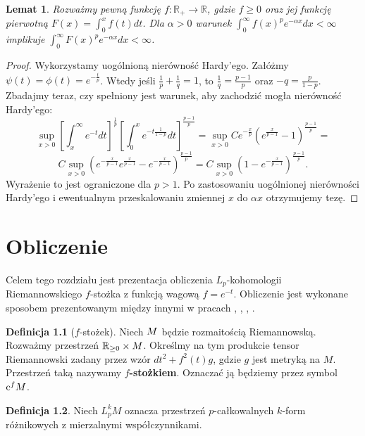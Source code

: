 \documentclass[licencjacka]{pracamgr}
\theoremstyle{definition}
\newtheorem{definition}{Definicja}[section]
\theoremstyle{definition}
\theoremstyle{plain}
\newtheorem{lemma}{Lemat}[section]
\theoremstyle{plain}
\def\cfm{\ensuremath\mathrm{c}^fM}
\def\M{\ensuremath M}
\begin{document}
\begin{lemma}
Rozważmy pewną funkcję $f: \mathbb{R}_{+} \rightarrow \mathbb{R}$, gdzie $f
\geq 0$ oraz jej funkcję pierwotną $F(x) = \int_0^{x} f(t) dt$. Dla $\alpha > 0$ warunek
$\int_0^\infty f(x)^p e^{-\alpha x}dx < \infty$ implikuje $\int_0^\infty
F(x)^pe^{- \alpha x}dx < \infty$.  \\
\end{lemma}
\begin{proof}
Wykorzystamy uogólnioną nierówność Hardy'ego.  Załóżmy $\psi(t) = \phi(t) =
e^{- \frac{t}{p} }$. Wtedy jeśli $\frac{1}{p} + \frac{1}{q} = 1 $, to
$\frac{1}{q} = \frac{p-1}{p}$ oraz $-q = \frac{p}{1-p}$.  Zbadajmy teraz, czy
spełniony jest warunek, aby zachodzić mogła nierówność Hardy'ego:
$$
\sup_{x > 0}
\left[
\int_x^\infty  
    e^{-t} dt
\right]^{\frac{1}{p}}
\left[
\int_0^x
    e^{-t \frac{1}{1-p}} dt
\right]^{\frac{p-1}{p}}
=
\sup_{x > 0}
    C
    e^{- \frac{x}{p}}
    \left(
        e^{\frac{x}{p-1}} - 1
    \right)^{\frac{p-1}{p}}
=
$$
$$
C
\sup_{x > 0}
    \left(
    e^{- \frac{x}{p-1}}
        e^{\frac{x}{p-1}} -
    e^{- \frac{x}{p-1}}
    \right)^{\frac{p-1}{p}}
=
C
\sup_{x > 0}
    \left(
        1 -
    e^{- \frac{x}{p-1}}
    \right)^{\frac{p-1}{p}}. 
$$
Wyrażenie to jest ograniczone dla $p> 1$. Po zastosowaniu uogólnionej
nierówności Hardy'ego i ewentualnym przeskalowaniu zmiennej $x$ do $\alpha x$
otrzymujemy tezę.
\end{proof}


\chapter{Obliczenie}

Celem tego rozdziału jest prezentacja obliczenia 
$L_p$-kohomologii Riemannowskiego $f$-stożka z funkcją wagową $f = e^{-t}$.
Obliczenie jest wykonane sposobem prezentowanym między innymi w
pracach \cite{cheeger}, \cite{youssin}, \cite{kirwan}, \cite{weber}.

\begin{definition}[$f$-stożek]
    Niech $\M$ będzie rozmaitością Riemannowską. Rozważmy przestrzeń
    $\mathbb{R}_{\geq 0} \times \M$. Określmy na tym produkcie tensor
    Riemannowski zadany przez wzór $dt^2 + f^{2}(t)g $, gdzie $g$ jest
    metryką na $M$.  Przestrzeń taką nazywamy \textbf{$f$-stożkiem}.
    Oznaczać ją będziemy przez symbol $\cfm$.
\end{definition}

\begin{definition}
  Niech $L_p^k M$ oznacza przestrzeń $p$-całkowalnych 
  $k$-form różnikowych z mierzalnymi  współczynnikami.
\end{definition}
\end{document}
